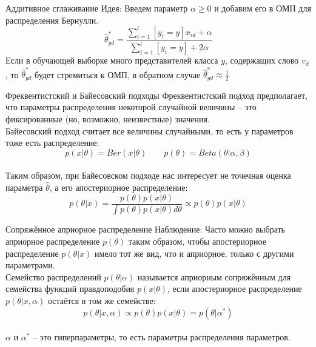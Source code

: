 \documentclass[10pt]{beamer}
\begin{document}
{
\begin{frame} {Аддитивное сглаживание}
  \alert{Идея}: Введем параметр $\alpha \geq 0$ и добавим его в ОМП для распределения Бернулли.\\
  $$\hat{\theta}_{yd}^* = \frac{\sum\limits_{i=1}^{l} [y_i = y] x_{id} + \alpha}{\sum\limits_{i=1}^{l} [y_i = y] + 2 \alpha}$$
  \bigbreak
  Если в обучающей выборке много представителей класса $y$, содержащих слово $v_d$, то $\hat{\theta}_{yd}^*$ будет стремиться к ОМП, в обратном случае $\hat{\theta}_{yd}^* \approx \frac{1}{2}$
\end{frame}
}

\begin{frame} {Фреквентистский и Байесовский подходы}
  Фреквентистский подход предполагает, что параметры распределения некоторой случайной величины -- это фиксированные (но, возможно, неизвестные) значения.\\
  \pause
  \bigbreak
  Байесовский подход считает все величины случайными, то есть у параметров тоже есть распределение:\\
  $$p(x|\theta) = Ber(x|\theta) \qquad p(\theta) = Beta(\theta|\alpha, \beta)$$\\
  Таким образом, при Байесовском подходе нас интересует не точечная оценка параметра $\hat{\theta}$, а его апостериорное распределение:\\
  \pause
  $$p(\theta|x) = \frac{p(\theta) p(x|\theta)}{\int p(\theta) p(x|\theta) d\theta} \propto p(\theta) p(x|\theta) $$
\end{frame}

\begin{frame}{Сопряжённое априорное распределение}
  \alert{Наблюдение}: Часто можно выбрать априорное распределение $p(\theta)$ таким образом, чтобы апостериорное распределение $p(\theta|x)$ имело тот же вид, что и априорное, только с другими параметрами.\\
  \bigbreak
  \pause
  Семейство распределений $p(\theta|\alpha)$ называется априорным сопряжённым для семейства функций правдоподобия $p(x|\theta)$, если апостериорное распределение $p(\theta|x, \alpha)$ остаётся в том же семействе:\\
  $$p(\theta|x, \alpha) \propto p(\theta) p(x|\theta)  = p(\theta|\alpha^*)$$\\
  \bigbreak
  $\alpha$ и $\alpha^*$ -- это \alert{гипер}параметры, то есть параметры распределения параметров.
\end{frame}
\end{document}
